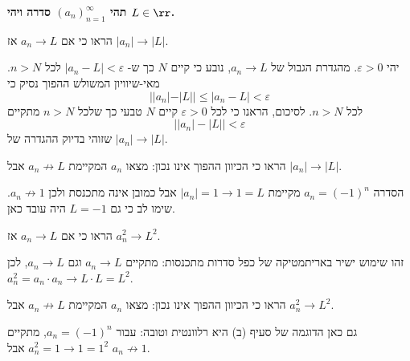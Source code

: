 \textbf{תהי
$(a_n)_{n=1}^{\infty}$
סדרה
ויהי
$L\in\rr$.}
\bE
\item
    הראו כי אם
    $a_n\rightarrow L$
    אז
    $|a_n|\rightarrow |L|$.
    \begin{solbox}
     יהי
    $\varepsilon>0$.
    מהגדרת הגבול של
    $a_n\to L$,
    נובע כי
    קיים
    $N$
    כך ש-
    $|a_n-L|<\varepsilon$
    לכל
    $n>N$.
    מאי-שיוויון המשולש ההפוך נסיק כי
    $$||a_n|-|L||\leq|a_n-L|<\varepsilon$$
    לכל
    $n>N$.
    לסיכום, הראנו כי לכל
    $\varepsilon>0$
    קיים
    $N$
    טבעי כך שלכל
    $n>N$
    מתקיים
    $$\left| |a_n|-|L|\right|<\varepsilon$$
    שזוהי בדיוק ההגדרה של
    $|a_n|\to |L|$.

\end{solbox}
    \item
    הראו כי הכיוון ההפוך אינו נכון:
    מצאו
    $a_n$
    המקיימת
    $a_n\not\rightarrow L$
    אבל
    $|a_n|\rightarrow |L|$.
    
\begin{solbox}
    הסדרה
    $a_n=(-1)^n$
    מקיימת
    $|a_n|=1\to 1=L$
    אבל כמובן אינה מתכנסת ולכן
    $a_n\not\to 1$.
    שימו לב כי גם
    $L=-1$
    היה עובד כאן.
\end{solbox}
    \item
    הראו כי אם
    $a_n\rightarrow L$
    אז
    $a_n^2\rightarrow L^2$.
    \begin{solbox}
    זהו שימוש ישיר באריתמטיקה של כפל סדרות מתכנסות: מתקיים
    $a_n\to L$
    וגם
    $a_n\to L$,
    לכן
    $a_n^2=a_n\cdot a_n\to L\cdot L=L^2$.
\end{solbox}
      \item
    הראו כי הכיוון ההפוך אינו נכון: מצאו
    $a_n$
    המקיימת
    $a_n\not\rightarrow L$
    אבל
    $a_n^2\rightarrow L^2$.
    
\begin{solbox}
    גם כאן הדוגמה של סעיף (ב) היא רלוונטית וטובה:
    עבור
    $a_n=(-1)^n$,
    מתקיים
    $a_n^2=1\to 1=1^2$
    אבל
    $a_n\not\to 1$.
\end{solbox}
    \eE
